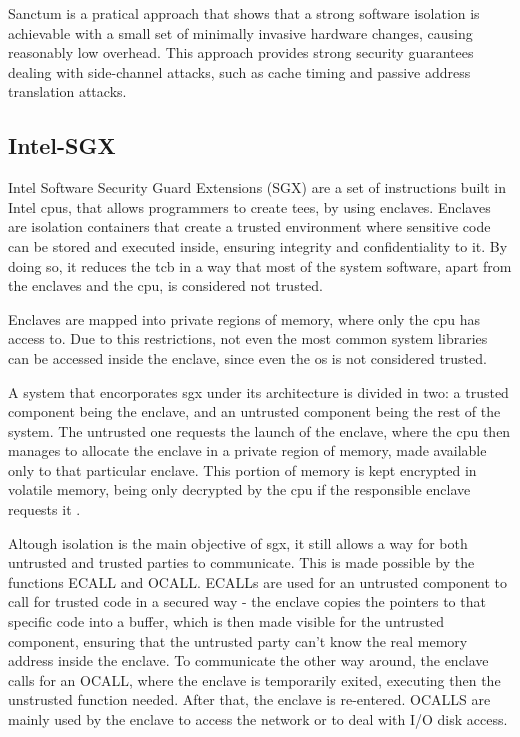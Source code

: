 Sanctum is a pratical approach that shows that a strong software isolation is achievable with a small set of minimally invasive hardware changes, causing reasonably low overhead. 
This approach provides strong security guarantees dealing with side-channel attacks, such as cache timing and passive address translation attacks.

\subsection{Intel-SGX}
\label{ssec:intelsgx}
Intel Software Security Guard Extensions (SGX) are a set of instructions built in Intel \gls{cpu}s, that allows programmers to create \gls{tee}s, by using enclaves. Enclaves are isolation containers that create a trusted environment where sensitive code can be stored and executed inside, ensuring integrity and confidentiality to it. By doing so, it reduces the \gls{tcb} in a way that most of the system software, apart from the enclaves and the \gls{cpu}, is considered not trusted.

Enclaves are mapped into private regions of memory, where only the \gls{cpu} has access to. Due to this restrictions, not even the most common system libraries can be accessed inside the enclave, since even the \gls{os} is not considered trusted. 

A system that encorporates \gls{sgx} under its architecture is divided in two: a trusted component being the enclave, and an untrusted component being the rest of the system. The untrusted one requests the launch of the enclave, where the \gls{cpu} then manages to allocate the enclave in a private region of memory, made available only to that particular enclave. This portion of memory is kept encrypted in volatile memory, being only decrypted by the \gls{cpu} if the responsible enclave requests it \cite{guiBorgesThesis}.

Altough isolation is the main objective of \gls{sgx}, it still allows a way for both  untrusted and trusted parties to communicate. This is made possible by the functions ECALL and OCALL. ECALLs are used for an untrusted component to call for trusted code in a secured way - the enclave copies the pointers to that specific code into a buffer, which is then made visible for the untrusted component, ensuring that the untrusted party can't know the real memory address inside the enclave. To communicate the other way around, the enclave calls for an OCALL, where the enclave is temporarily exited, executing then the unstrusted function needed. After that, the enclave is re-entered. OCALLS are mainly used by the enclave to access the network or to deal with I/O disk access.

